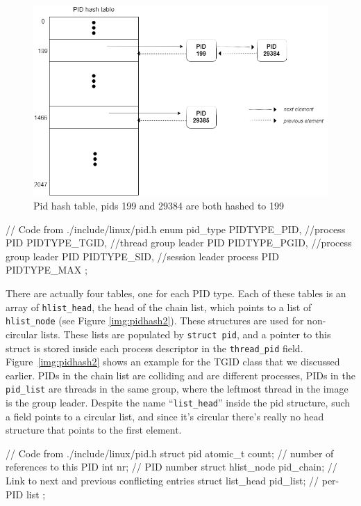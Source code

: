 \begin{figure}[ht]
\includegraphics[width=\textwidth]{images/pidhash1}
\caption{Pid hash table, pids 199 and 29384 are both hashed to 199}
\label{img:pidhash1}
\end{figure}

\begin{code}
// Code from ./include/linux/pid.h
enum pid_type {
	PIDTYPE_PID,  //process PID
	PIDTYPE_TGID, //thread group leader PID
	PIDTYPE_PGID, //process group leader PID
	PIDTYPE_SID,  //session leader process PID
	PIDTYPE_MAX
};
\end{code}
There are actually four tables, one for each PID type. Each of these tables is an array of \verb|hlist_head|, the head of the chain list, which points to a list of \verb|hlist_node| (see Figure \ref{img:pidhash2}). These  structures are used for non-circular lists. These lists are populated by \verb|struct pid|, and a pointer to this struct is stored inside each process descriptor in the \verb|thread_pid| field. Figure~\ref{img:pidhash2} shows an example for the TGID class that we discussed earlier. PIDs in the chain list are colliding and are different processes, PIDs in the \verb|pid_list| are threads in the same group, where the leftmost thread in the image is the group leader. Despite the name ``\verb|list_head|'' inside the pid structure, such a field points to a circular list, and since it's circular there's really no head structure that points to the first element. %

\begin{code}
// Code from ./include/linux/pid.h
struct pid {
        atomic_t count; // number of references to this PID
	int nr; // PID number
	struct hlist_node pid_chain; // Link to next and previous conflicting entries
	struct list_head pid_list;  // per-PID list
};
\end{code}


